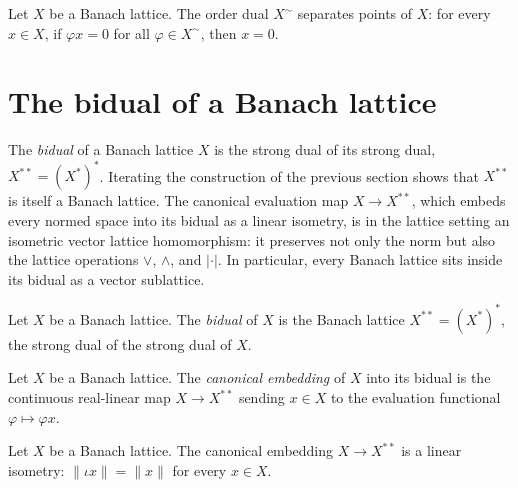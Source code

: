 \begin{theorem}
\label{thm:strongDual-orderDual-separatesPoints}
\leanok
{}
Let $X$ be a Banach lattice. The order dual $X^{\sim}$ separates
points of $X$: for every $x \in X$, if $\varphi x = 0$ for all
$\varphi \in X^{\sim}$, then $x = 0$.
\end{theorem}

\section{The bidual of a Banach lattice}

The \emph{bidual} of a Banach lattice $X$ is the strong dual of
its strong dual, $X^{**} = (X^{*})^{*}$. Iterating the
construction of the previous section shows that $X^{**}$ is itself
a Banach lattice. The canonical evaluation map $X \to X^{**}$,
which embeds every normed space into its bidual as a linear
isometry, is in the lattice setting an isometric vector lattice
homomorphism: it preserves not only the norm but also the lattice
operations $\vee$, $\wedge$, and $\lvert \cdot \rvert$. In
particular, every Banach lattice sits inside its bidual as a
vector sublattice.

\begin{definition}
\label{def:bidualSpace}
\leanok
{}
Let $X$ be a Banach lattice. The \emph{bidual} of $X$ is the
Banach lattice $X^{**} = (X^{*})^{*}$, the strong dual of the
strong dual of $X$.
\end{definition}

\begin{definition}
\label{def:bidualSpace-inclusion}
\leanok
{}
Let $X$ be a Banach lattice. The \emph{canonical embedding} of
$X$ into its bidual is the continuous real-linear map $X \to
X^{**}$ sending $x \in X$ to the evaluation functional $\varphi
\mapsto \varphi x$.
\end{definition}

\begin{theorem}
\label{thm:bidualSpace-norm-inclusion}
\leanok
{}
Let $X$ be a Banach lattice. The canonical embedding $X \to
X^{**}$ is a linear isometry: $\lVert \iota x \rVert = \lVert x
\rVert$ for every $x \in X$.
\end{theorem}

